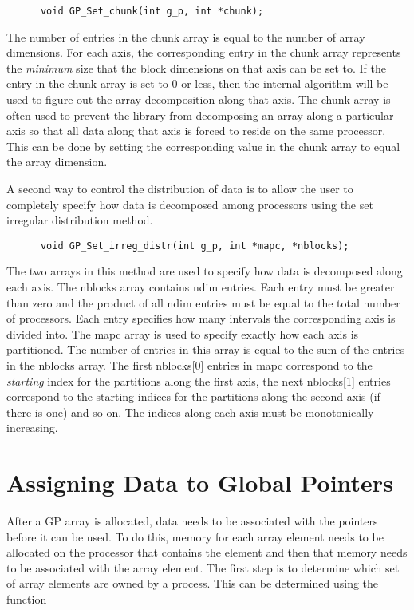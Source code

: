\begin{verbatim}
      void GP_Set_chunk(int g_p, int *chunk);
\end{verbatim}

\noindent
The number of entries in the chunk array is equal to the number of array
dimensions. For each axis, the corresponding entry in the chunk array
represents the \emph{minimum} size that the block dimensions on that axis can be
set to. If the entry in the chunk array is set to 0 or less, then the internal
algorithm will be used to figure out the array decomposition along that axis.
The chunk array is often used to prevent the library from decomposing an array
along a particular axis so that all data along that axis is forced to reside on the
same processor. This can be done by setting the corresponding value in the chunk
array to equal the array dimension.

A second way to control the distribution of data is to allow the user to
completely specify how data is decomposed among processors using the set
irregular distribution method.
 
\begin{verbatim}
      void GP_Set_irreg_distr(int g_p, int *mapc, *nblocks);
\end{verbatim}

\noindent
The two arrays in this method are used to specify how data is decomposed along
each axis. The nblocks array contains ndim entries. Each entry must be greater
than zero and the product of all ndim entries must be equal to the total number
of processors. Each entry specifies how many intervals the corresponding axis is
divided into. The mapc array is used to specify exactly how each axis is
partitioned. The number of entries in this array is equal to the sum of the
entries in the nblocks array. The first nblocks[0] entries in mapc correspond to
the \emph{starting} index for the partitions along the first axis, the next
nblocks[1] entries correspond to the starting indices for the partitions along
the second axis (if there is one) and so on. The indices along each axis must be
monotonically increasing.

\section{Assigning Data to Global Pointers}

After a GP array is allocated, data needs to be associated with the pointers
before it can be used. To do this, memory for each array element needs to be
allocated on the processor that contains the element and then that memory needs
to be associated with the array element. The first step is to determine which
set of array elements are owned by a process. This can be determined using the
function
 
